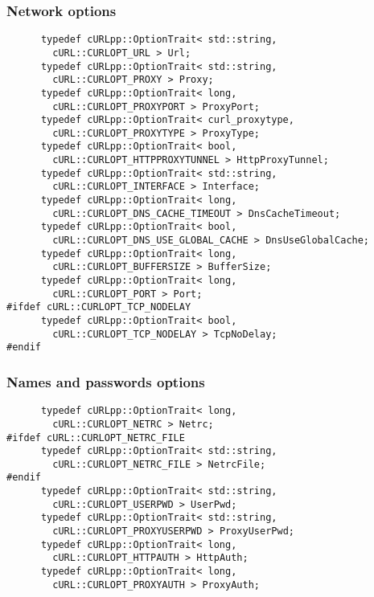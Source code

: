 \documentclass{article}
\begin{document}
\subsubsection{Network options}
\begin{verbatim}
      typedef cURLpp::OptionTrait< std::string, 
        cURL::CURLOPT_URL > Url;
      typedef cURLpp::OptionTrait< std::string, 
        cURL::CURLOPT_PROXY > Proxy;
      typedef cURLpp::OptionTrait< long, 
        cURL::CURLOPT_PROXYPORT > ProxyPort;
      typedef cURLpp::OptionTrait< curl_proxytype, 
        cURL::CURLOPT_PROXYTYPE > ProxyType;
      typedef cURLpp::OptionTrait< bool, 
        cURL::CURLOPT_HTTPPROXYTUNNEL > HttpProxyTunnel;
      typedef cURLpp::OptionTrait< std::string, 
        cURL::CURLOPT_INTERFACE > Interface;
      typedef cURLpp::OptionTrait< long, 
        cURL::CURLOPT_DNS_CACHE_TIMEOUT > DnsCacheTimeout;
      typedef cURLpp::OptionTrait< bool, 
        cURL::CURLOPT_DNS_USE_GLOBAL_CACHE > DnsUseGlobalCache;
      typedef cURLpp::OptionTrait< long, 
        cURL::CURLOPT_BUFFERSIZE > BufferSize;
      typedef cURLpp::OptionTrait< long, 
        cURL::CURLOPT_PORT > Port;
#ifdef cURL::CURLOPT_TCP_NODELAY
      typedef cURLpp::OptionTrait< bool, 
        cURL::CURLOPT_TCP_NODELAY > TcpNoDelay;
#endif
\end{verbatim}


\subsubsection{Names and passwords options}
\begin{verbatim}
      typedef cURLpp::OptionTrait< long, 
        cURL::CURLOPT_NETRC > Netrc;
#ifdef cURL::CURLOPT_NETRC_FILE
      typedef cURLpp::OptionTrait< std::string, 
        cURL::CURLOPT_NETRC_FILE > NetrcFile;
#endif
      typedef cURLpp::OptionTrait< std::string, 
        cURL::CURLOPT_USERPWD > UserPwd;
      typedef cURLpp::OptionTrait< std::string, 
        cURL::CURLOPT_PROXYUSERPWD > ProxyUserPwd;
      typedef cURLpp::OptionTrait< long, 
        cURL::CURLOPT_HTTPAUTH > HttpAuth;
      typedef cURLpp::OptionTrait< long, 
        cURL::CURLOPT_PROXYAUTH > ProxyAuth;
\end{verbatim}
\end{document}
